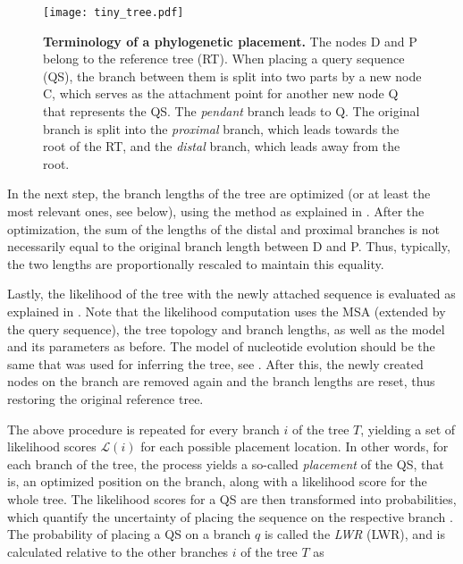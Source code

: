 \begin{figure}[pthb]
    \centering
    \texttt{[image: tiny\_tree.pdf]}
    \caption[Terminology of a phylogenetic placement]{
        \textbf{Terminology of a phylogenetic placement.}
        The nodes {\sffamily D} and {\sffamily P} belong to the reference tree (RT).
        When placing a query sequence (QS), the branch between them %
        is split into two parts by a new node {\sffamily C},
        which serves as the attachment point for another new node {\sffamily Q} that represents the QS.
        The \emph{pendant} branch leads to {\sffamily Q}.
        The original branch is split into the \emph{proximal} branch, which leads towards the root of the RT,
        and the \emph{distal} branch, which leads away from the root.
    }
    \label{fig:tiny_tree}
\end{figure}

In the next step, the branch lengths of the tree are optimized (or at least the most relevant ones, see below),
using the method as explained in .
After the optimization, the sum of the lengths of the distal and proximal branches is not necessarily equal
to the original branch length between {\sffamily D} and {\sffamily P}.
Thus, typically, the two lengths are proportionally rescaled to maintain this equality.

Lastly, the likelihood of the tree with the newly attached sequence is evaluated
as explained in .
Note that the likelihood computation uses the MSA (extended by the query sequence),
the tree topology and branch lengths, as well as the model and its parameters as before.
The model of nucleotide evolution should be the same that was used for inferring the tree,
see .
After this, the newly created nodes on the branch are removed again and the branch lengths are reset,
thus restoring the original reference tree.

The above procedure is repeated for every branch $i$ of the tree $T$,
yielding a set of likelihood scores $\mathcal{L}(i)$ for each possible placement location.
In other words, for each branch of the tree, the process yields a so-called \emph{placement} of the \ac{QS},
that is, an optimized position on the branch, along with a likelihood score for the whole tree.
The likelihood scores for a \ac{QS} are then transformed into probabilities,
which quantify the uncertainty of placing the sequence on the respective branch \cite{Strimmer2002,VonMering2007}.
The probability of placing a \ac{QS} on a branch $q$ is called the \emph{\acl{LWR}} (\acs{LWR}),
and is calculated relative to the other branches $i$ of the tree $T$ as

